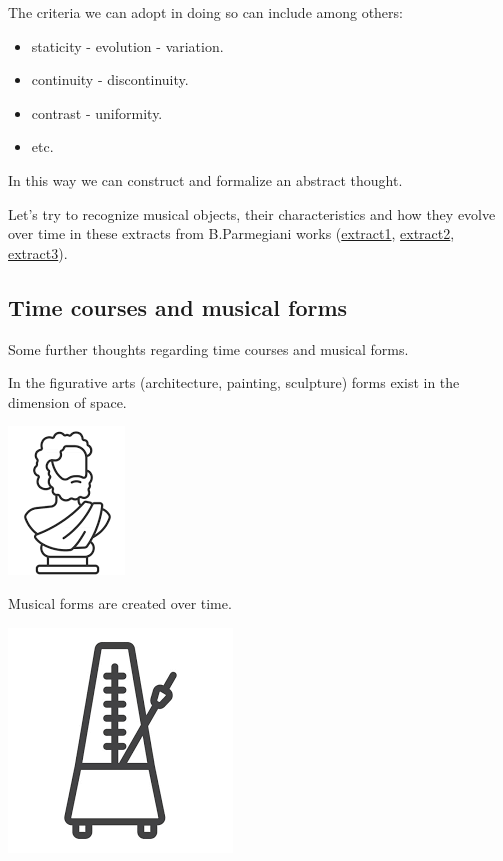 \begin{itemize}
  The criteria we can adopt in doing so can include among others:

  \begin{itemize}
  \tightlist
  \item staticity - evolution - variation.
  \item continuity - discontinuity.
  \item contrast - uniformity.
  \item etc.
  \end{itemize}
\end{itemize}

In this way we can construct and formalize an abstract thought.

Let's try to recognize musical objects, their characteristics and how they evolve over time in these extracts from B.Parmegiani works (\href{https://github.com/musicaecodice/EMC/blob/main/3_fixed/suoni/parme1.mp4}{extract1}, \href{https://github.com/musicaecodice/EMC/blob/main/3_fixed/suoni/parme2.mp3}{extract2}, \href{https://github.com/musicaecodice/EMC/blob/main/3_fixed/suoni/parme3.mp3}{extract3}).

\subsection{Time courses and musical forms}\label{time-courses-and-musical-forms}

Some further thoughts regarding time courses and musical forms.

In the figurative arts (architecture, painting, sculpture) forms exist in the dimension of space.

\begin{center}
\includegraphics[scale=0.4]{../img/scultura.png}
\end{center}

Musical forms are created over time.

\begin{center}
\includegraphics[scale=0.2]{../img/metronomo.png}
\end{center}

